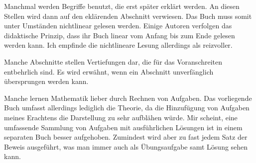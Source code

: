
Manchmal werden Begriffe benutzt, die erst später erklärt werden.
An diesen Stellen wird dann auf den eklärenden Abschnitt verwiesen.
Das Buch muss somit unter Umständen nichtlinear gelesen werden. Einige
Autoren verfolgen das didaktische Prinzip, dass ihr Buch linear vom Anfang
bis zum Ende gelesen werden kann. Ich empfinde die nichtlineare Lesung
allerdings als reizvoller.

Manche Abschnitte stellen Vertiefungen dar, die für das Voranschreiten
entbehrlich sind. Es wird erwähnt, wenn ein Abschnitt unverfänglich
übersprungen werden kann.

Manche lernen Mathematik lieber durch Rechnen von Aufgaben. Das
vorliegende Buch umfasst allerdings lediglich die Theorie, da
die Hinzufügung von Aufgaben meines Erachtens die Darstellung zu sehr
aufblähen würde. Mir scheint, eine umfassende Sammlung von Aufgaben
mit ausführlichen Lösungen ist in einem separaten Buch besser
aufgehoben. Zumindest wird aber zu fast jedem Satz der Beweis
ausgeführt, was man immer auch als Übungsaufgabe samt Lösung sehen kann.

